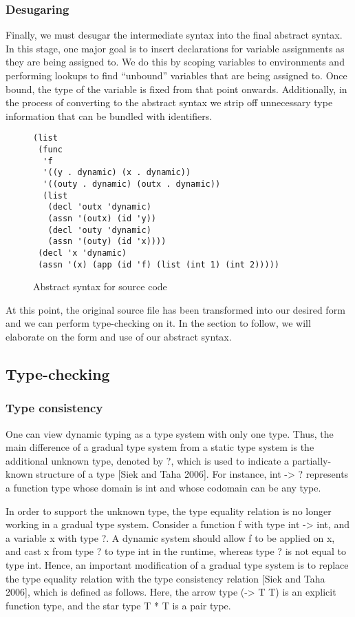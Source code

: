 \subsubsection{Desugaring}
Finally, we must desugar the intermediate syntax into the final abstract syntax. In this stage, one major goal is to insert declarations for variable assignments as they are being assigned to. We do this by scoping variables to environments and performing lookups to find ``unbound'' variables that are being assigned to. Once bound, the type of the variable is fixed from that point onwards. Additionally, in the process of converting to the abstract syntax we strip off unnecessary type information that can be bundled with identifiers.

\begin{figure}[h]
    \begin{lstlisting}[language=racket]
(list
 (func
  'f
  '((y . dynamic) (x . dynamic))
  '((outy . dynamic) (outx . dynamic))
  (list
   (decl 'outx 'dynamic)
   (assn '(outx) (id 'y))
   (decl 'outy 'dynamic)
   (assn '(outy) (id 'x))))
 (decl 'x 'dynamic)
 (assn '(x) (app (id 'f) (list (int 1) (int 2)))))
    \end{lstlisting}
    \caption[]{Abstract syntax for source code}
    \label{fig:ast}
\end{figure}

At this point, the original source file has been transformed into our desired form and we can perform type-checking on it. In the section to follow, we will elaborate on the form and use of our abstract syntax.

\subsection{Type-checking}

\subsubsection{Type consistency}
One can view dynamic typing as a type system with only one type. Thus, the main difference of a gradual type system from a static type system is the additional unknown type, denoted by ?, which is used to indicate a partially-known structure of a type [Siek and Taha 2006]. For instance, int -> ? represents a function type whose domain is int and whose codomain can be any type.

In order to support the unknown type, the type equality relation is no longer working in a gradual type system. Consider a function f with type int -> int, and a variable x with type ?. A dynamic system should allow f to be applied on x, and cast x from type ? to type int in the runtime, whereas type ? is not equal to type int. Hence, an important modification of a gradual type system is to replace the type equality relation with the type consistency relation [Siek and Taha 2006], which is defined as follows. Here, the arrow type (-> T T) is an explicit function type, and the star type T * T is a pair type.

